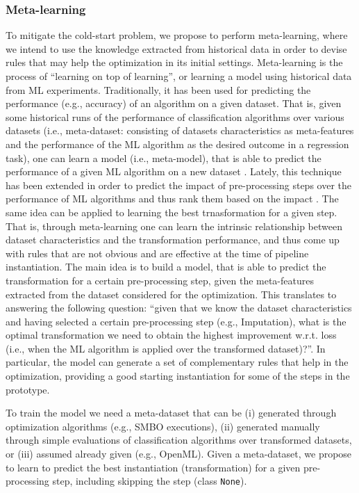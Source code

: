 \subsubsection{Meta-learning}
To mitigate the cold-start problem, we propose to perform meta-learning, where we intend to use the knowledge extracted from historical data in order to devise rules that may help the optimization in its initial settings.
Meta-learning is the process of ``learning on top of learning'', or learning a model using historical data from ML experiments.
Traditionally, it has been used for predicting the performance (e.g., accuracy) of an algorithm on a given dataset.
That is, given some historical runs of the performance of classification algorithms over various datasets (i.e., meta-dataset: consisting of datasets characteristics as meta-features and the performance of the ML algorithm as the desired outcome in a regression task), one can learn a model (i.e., meta-model), that is able to predict the performance of a given ML algorithm on a new dataset \cite{Brazdil04Book}.
Lately, this technique has been extended in order to predict the impact of pre-processing steps over the performance of ML algorithms and thus rank them based on the impact \cite{Bilalli17AMCS, presistant18CSI, presistant19DKE}.
The same idea can be applied to learning the best trnasformation for a given step.
That is, through meta-learning one can learn the intrinsic relationship between dataset characteristics and the transformation performance, and thus come up with rules that are not obvious and are effective at the time of pipeline instantiation.
The main idea is to build a model, that is able to predict the transformation for a certain pre-processing step, given the meta-features extracted from the dataset considered for the optimization.
This translates to answering the following question: ``given that we know the dataset characteristics and having selected a certain pre-processing step (e.g., Imputation), what is the optimal transformation we need to obtain the highest improvement w.r.t. loss (i.e., when the ML algorithm is applied over the transformed dataset)?''.
In particular, the model can generate a set of complementary rules that help in the optimization, providing a good starting instantiation for some of the steps in the prototype.

To train the model we need a meta-dataset that can be  (i) generated through optimization algorithms (e.g., SMBO executions), (ii) generated manually through simple evaluations of classification algorithms over transformed datasets, or (iii) assumed already given (e.g., OpenML).
Given a meta-dataset, we propose to learn to predict the best instantiation (transformation) for a given pre-processing step, including skipping the step (class \texttt{None}).

